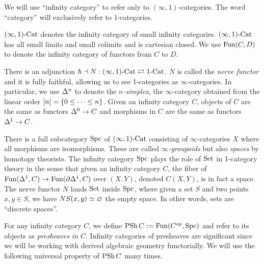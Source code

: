 \documentclass[./main.tex]{subfiles}
\begin{document}
  
We will use ``infinity category'' to refer only to 
$(\infty,1)$-categories.
The word ``category'' will exclusively refer to $1$-categories.

$(\infty,1)\text{-}\mathrm{Cat}$ denotes the infinity category of 
small infinity categories. 
$(\infty,1)\text{-}\mathrm{Cat}$ has all small limits \cite[Cor 7.4.1.11]{Kerodon}
and small colimits \cite[Cor 7.4.3.13]{Kerodon} and
is cartesian closed.
We use $\mathrm{Fun}(C,D)$ to denote the infinity category of functors from
$C$ to $D$.

There is an adjunction 
$h \dashv N : (\infty,1)\text{-}\mathrm{Cat} \rightleftarrows 1\text{-}\mathrm{Cat}$.
$N$ is called the \emph{nerve functor} and it is fully faithful,
allowing us to see 1-categories as $\infty$-categories.
In particular, we use $\Delta^n$ to denote the \emph{$n$-simplex},
the $\infty$-category obtained from the linear order
$[n] = \left\{0 \leq \cdots \leq n\right\}$.
Given an infinity category $C$,
objects of $C$ are the same as functors $\Delta^0 \to C$
and morphisms in $C$ are the same as functors $\Delta^1 \to C$.

There is a full subcategory $\mathrm{Spc}$ of $(\infty,1)\text{-}\mathrm{Cat}$ consisting
of $\infty$-categories $X$ where all morphisms are isomorphisms.
These are called \emph{$\infty$-groupoids} but also \emph{spaces}
by homotopy theorists.
The infinity category $\mathrm{Spc}$ plays the role of $\mathrm{Set}$ in 1-category theory
in the sense that given an infinity category $C$,
the fiber of $\mathrm{Fun}(\Delta^1 , C) \to \mathrm{Fun}(\partial\Delta^1 , C)$
over $(X,Y)$, denoted $C(X,Y)$, is in fact a space.
The nerve functor $N$ lands $\mathrm{Set}$ inside $\mathrm{Spc}$,
where given a set $S$ and two points $x, y \in S$,
we have $NS(x,y) \simeq \varnothing$ the empty space.
In other words, sets are ``discrete spaces''.

For any infinity category $C$, 
we define $\mathrm{PSh}\,C := \mathrm{Fun}(C^{op},\mathrm{Spc})$ and refer to its objects as
\emph{presheaves in $C$}.
Infinity categories of presheaves are significant since
we will be working with derived algebraic geometry functorially.
We will use the following universal property of $\mathrm{PSh}\,C$ many times.
\end{document}
